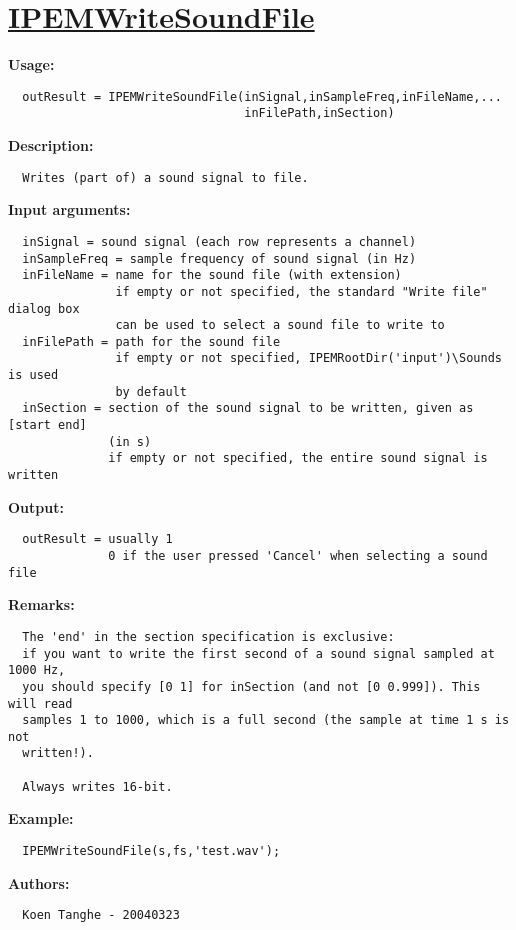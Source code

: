 \newpage
\section*{\hyperlink{Concepts:IPEMWriteSoundFile}{IPEMWriteSoundFile}}
\hypertarget{FuncRef:IPEMWriteSoundFile}{}

\textbf{Usage:}
\begin{verbatim}  outResult = IPEMWriteSoundFile(inSignal,inSampleFreq,inFileName,...
                                 inFilePath,inSection)

\end{verbatim}
\textbf{Description:}
\begin{verbatim}  Writes (part of) a sound signal to file.

\end{verbatim}
\textbf{Input arguments:}
\begin{verbatim}  inSignal = sound signal (each row represents a channel)
  inSampleFreq = sample frequency of sound signal (in Hz)
  inFileName = name for the sound file (with extension)
               if empty or not specified, the standard "Write file" dialog box
               can be used to select a sound file to write to
  inFilePath = path for the sound file
               if empty or not specified, IPEMRootDir('input')\Sounds is used
               by default
  inSection = section of the sound signal to be written, given as [start end]
              (in s)
              if empty or not specified, the entire sound signal is written

\end{verbatim}
\textbf{Output:}
\begin{verbatim}  outResult = usually 1
              0 if the user pressed 'Cancel' when selecting a sound file

\end{verbatim}
\textbf{Remarks:}
\begin{verbatim}  The 'end' in the section specification is exclusive:
  if you want to write the first second of a sound signal sampled at 1000 Hz,
  you should specify [0 1] for inSection (and not [0 0.999]). This will read
  samples 1 to 1000, which is a full second (the sample at time 1 s is not
  written!).

  Always writes 16-bit.

\end{verbatim}
\textbf{Example:}
\begin{verbatim}  IPEMWriteSoundFile(s,fs,'test.wav');

\end{verbatim}
\textbf{Authors:}
\begin{verbatim}  Koen Tanghe - 20040323
\end{verbatim}


